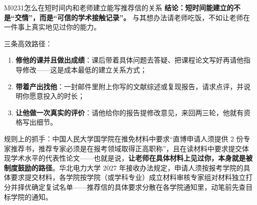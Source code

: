 \begin{qa}{M0231}{怎么在短时间内和老师建立能写推荐信的关系}
\textbf{结论：短时间能建立的不是“交情”，而是“可信的学术接触记录”。} 与其想办法请老师吃饭，不如让老师在一件事上真实地见过你的能力。

三条高效路径：
\begin{enumerate}
  \item \textbf{修他的课并且做出成绩}：课后带着具体问题去答疑、把课程论文写好再请他指导修改——这是成本最低的建立关系方式；
  \item \textbf{带着产出找他}：一封邮件里附上你写的文献综述或复现报告，请求点评，并说明你愿意投入的时长；
  \item \textbf{让他做一次真实的评价}：请他给你的报告提修改意见，来回两三轮，他就有资格写出细节。
\end{enumerate}

规则上的抓手：中国人民大学国学院在推免材料中要求“直博申请人须提供 2 份专家推荐书，推荐专家必须是在报考领域取得正高职称”，且在读材料中要求提交体现学术水平的代表性论文——也就是说，\textbf{让老师在具体材料上见过你，本身就是被制度鼓励的路径}。华北电力大学 2027 年接收办法规定，申请人须按报考学院的具体要求提交材料，各学院按学院（或学科专业）成立材料审核专家组对材料独立打分并择优确定复试名单——推荐信的具体要求分散在各学院通知里，动笔前先查目标学院的通知。
\end{qa}


